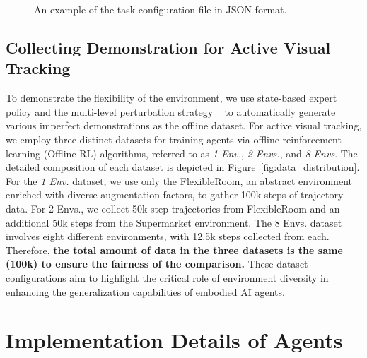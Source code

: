 \begin{figure}[t]
\begin{tcolorbox}[title= A Json File for Task Configuration ]
\begin{lstlisting}[texcl=true, escapechar=|]
\end{lstlisting}
\end{tcolorbox}
  \caption{An example of the task configuration file in JSON format.}
    \label{app:json}
  \label{figure:task_json}
\end{figure}

\subsection{Collecting Demonstration for Active Visual Tracking}
To demonstrate the flexibility of the environment, we use state-based expert policy and the multi-level perturbation strategy ~\citep{zhong2024empowering} to automatically generate various imperfect demonstrations as the offline dataset. 
For active visual tracking, we employ three distinct datasets for training agents via offline reinforcement learning (Offline RL) algorithms, referred to as \textit{1 Env.}, \textit{2 Envs.}, and \textit{8 Envs}. The detailed composition of each dataset is depicted in Figure~\ref{fig:data_distribution}. For the \textit{1 Env.} dataset, we use only the FlexibleRoom, an abstract environment enriched with diverse augmentation factors, to gather 100k steps of trajectory data. For 2 Envs., we collect 50k step trajectories from FlexibleRoom and an additional 50k steps from the Supermarket environment. The 8 Envs. dataset involves eight different environments, with 12.5k steps collected from each. Therefore, \textbf{the total amount of data in the three datasets is the same (100k) to ensure the fairness of the comparison.}
These dataset configurations aim to highlight the critical role of environment diversity in enhancing the generalization capabilities of embodied AI agents.

\section{Implementation Details of Agents}

